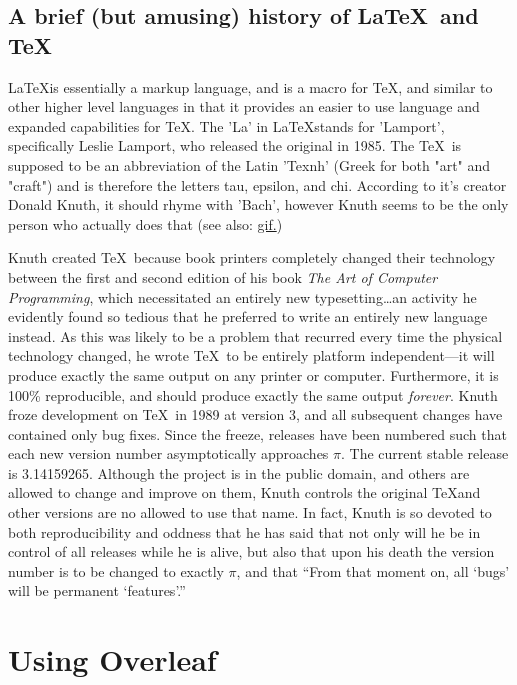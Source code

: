 \documentclass[12pt]{article}
\begin{document}
\subsection{A brief (but amusing) history of \LaTeX ~and \TeX}
\LaTeX is essentially a markup language, and is a macro for \TeX, and similar to other higher level languages in that it provides an easier to use language and expanded capabilities for \TeX. The 'La' in \LaTeX stands for 'Lamport', specifically Leslie Lamport, who released the original in 1985. The \TeX ~is supposed to be an abbreviation of the Latin 'Texnh' (Greek for both "art" and "craft") and is therefore the letters tau, epsilon, and chi. According to it's creator Donald Knuth, it should rhyme with 'Bach', however Knuth seems to be the only person who actually does that (see also: \href{http://bits.blogs.nytimes.com/2013/05/23/battle-over-gif-pronunciation-erupts/?_r=0}{gif.}) 

Knuth created \TeX ~because book printers completely changed their technology between the first and second edition of his book \textit{The Art of Computer Programming}, which necessitated an entirely new typesetting\ldots an activity he evidently found so tedious that he preferred to write an entirely new language instead. As this was likely to be a problem that recurred every time the physical technology changed, he wrote \TeX ~to be entirely platform independent---it will produce exactly the same output on any printer or computer. Furthermore, it is 100\% reproducible, and should produce exactly the same output \emph{forever}. Knuth froze development on \TeX ~in 1989 at version 3, and all subsequent changes have contained only bug fixes. Since the freeze, releases have been numbered such that each new version number asymptotically approaches $\pi$. The current stable release is 3.14159265. Although the project is in the public domain, and others are allowed to change and improve on them, Knuth controls the original \TeX and other versions are no allowed to use that name. In fact, Knuth is so devoted to both reproducibility and oddness that he has said that not only will he be in control of all releases while he is alive, but also that upon his death the version number is to be changed to exactly $\pi$, and that ``From that moment on, all `bugs' will be
permanent `features'.''\cite{Knuth:y-6v-DJk}

\section{Using Overleaf}
\end{document}
